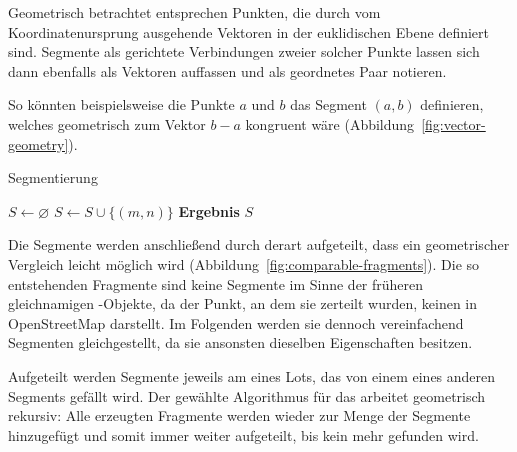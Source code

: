 \documentclass[../main/thesis.tex]{subfiles}
\begin{document}
Geometrisch betrachtet entsprechen  Punkten, die durch vom Koordinatenursprung ausgehende Vektoren in der euklidischen Ebene definiert sind.
Segmente als gerichtete Verbindungen zweier solcher Punkte lassen sich dann ebenfalls als Vektoren auffassen und als geordnetes Paar notieren.

So könnten beispielsweise die Punkte $a$ und $b$ das Segment $(a,b)$ definieren, welches geometrisch zum Vektor $b - a$ kongruent wäre (Abbildung~\ref{fig:vector-geometry}).

\begin{algorithmhere}{Segmentierung}
\label{alg:Segmentierung}
\begin{algorithmic}
	\State $S \gets \varnothing$
			\State $S \gets S \cup \{(m,n)\}$
		\EndFor
	\EndFor
	\State \textbf{Ergebnis} $S$
\EndFunction
\end{algorithmic}
\end{algorithmhere}


Die Segmente werden anschließend durch  derart aufgeteilt, dass ein geometrischer Vergleich leicht möglich wird (Abbildung~\ref{fig:comparable-fragments}).
Die so entstehenden Fragmente sind keine Segmente im Sinne der früheren gleichnamigen \osm-Objekte, da der Punkt, an dem sie zerteilt wurden, keinen  in OpenStreetMap darstellt.
Im Folgenden werden sie dennoch vereinfachend Segmenten gleichgestellt, da sie ansonsten dieselben Eigenschaften besitzen.

Aufgeteilt werden Segmente jeweils am  eines Lots, das von einem  eines anderen Segments gefällt wird.
Der gewählte Algorithmus für das  arbeitet geometrisch rekursiv:
Alle erzeugten Fragmente werden wieder zur Menge der Segmente hinzugefügt und somit immer weiter aufgeteilt, bis kein  mehr gefunden wird.
\end{document}
